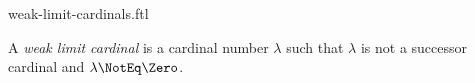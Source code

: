 \documentclass{stex}
\begin{document}
\begin{smodule}{weak-limit-cardinals.ftl}



\begin{definition*}[forthel,for=weak limit cardinal]
  A \emph{weak limit cardinal} is a cardinal number $\lambda$ such that $\lambda$ is not a successor cardinal and $\lambda \NotEq \Zero$.
\end{definition*}

\end{smodule}
\end{document}
